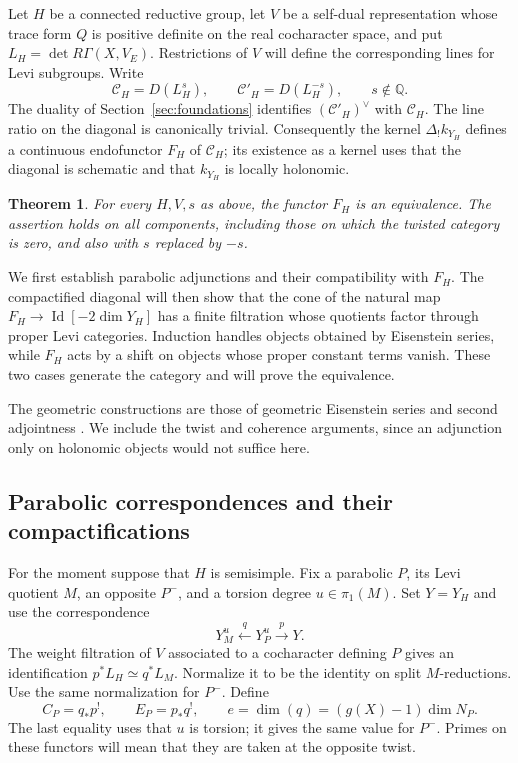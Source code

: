 \documentclass[11pt]{article}
\numberwithin{equation}{section}
\newtheorem{theorem}{Theorem}[section]
\theoremstyle{definition}
\theoremstyle{remark}
\begin{document}
Let $H$ be a connected reductive group, let $V$ be a self-dual representation
whose trace form $Q$ is positive definite on the real cocharacter space, and
put $L_H=\det R\Gamma(X,V_E)$.  Restrictions of $V$ will define the corresponding
lines for Levi subgroups.  Write
\[
 \mathcal C_H=D(L_H^s),\qquad \mathcal C'_H=D(L_H^{-s}),\qquad s\notin\mathbb Q.
\]
The duality of Section~\ref{sec:foundations} identifies
$(\mathcal C'_H)^\vee$ with $\mathcal C_H$.  The line ratio on the diagonal is
canonically trivial.  Consequently the kernel $\Delta_!k_{Y_H}$ defines a
continuous endofunctor $F_H$ of $\mathcal C_H$; its existence as a kernel uses
that the diagonal is schematic and that $k_{Y_H}$ is locally holonomic.

\begin{theorem}\label{pseudo:equivalence}
For every $H,V,s$ as above, the functor $F_H$ is an equivalence.  The assertion
holds on all components, including those on which the twisted category is
zero, and also with $s$ replaced by $-s$.
\end{theorem}

We first establish parabolic adjunctions and their compatibility with
$F_H$.  The compactified diagonal will then show that the cone of the
natural map $F_H\to\operatorname{Id}[-2\dim Y_H]$ has a finite
filtration whose quotients factor through proper Levi categories.  Induction handles objects obtained by
Eisenstein series, while $F_H$ acts by a shift on objects whose proper
constant terms vanish.  These two cases generate the category and will
prove the equivalence.

The geometric constructions are those of geometric Eisenstein series and second
adjointness \cite{BravermanGaitsgory,DrinfeldGaitsgoryCT}.  We include the twist
and coherence arguments, since an adjunction only on holonomic objects would
not suffice here.

\subsection{Parabolic correspondences and their compactifications}

For the moment suppose that $H$ is semisimple.  Fix a parabolic $P$, its Levi
quotient $M$, an opposite $P^-$, and a torsion degree $u\in\pi_1(M)$.  Set
$Y=Y_H$ and use the correspondence
\[
 Y_M^u\xleftarrow{\ q\ }Y_P^u\xrightarrow{\ p\ }Y.
\]
The weight filtration of $V$ associated to a cocharacter defining $P$ gives
an identification $p^*L_H\simeq q^*L_M$.  Normalize it to be the identity on
split $M$-reductions.  Use the same normalization for $P^-$.  Define
\[
 C_P=q_*p^!,\qquad E_P=p_*q^!,\qquad
 e=\dim(q)=(g(X)-1)\dim N_P.
\]
The last equality uses that $u$ is torsion; it gives the same value for $P^-$.
Primes on these functors will mean that they are taken at the opposite twist.
\end{document}
